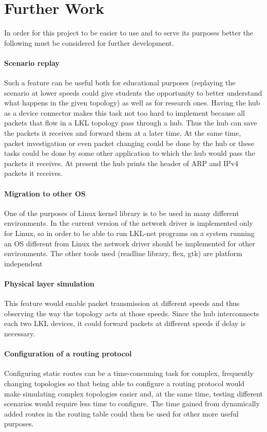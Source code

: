 \chapter{Further Work}
\label{chapter:further}
In order for this project to be easier to use and to serve its purposes better the following must be considered for further development.

\subsubsection{Scenario replay}
\label{sec:scenario-replay}
Such a feature can be useful both for educational purposes (replaying the scenario at lower speeds could give students the opportunity to better understand what happens in the given topology) as well as for research ones. Having the hub as a device connector makes this task not too hard to implement because all packets that flow in a LKL topology pass through a hub. Thus the hub can save the packets it receives and forward them at a later time. At the same time, packet investigation or even packet changing could be done by the hub or these tasks could be done by some other application to which the hub would pass the packets it receives. At present the hub prints the header of ARP and IPv4 packets it receives.

\subsubsection{Migration to other OS}
\label{sec:migration-os}
One of the purposes of Linux kernel library is to be used in many different environments. In the current version of \project the network driver is implemented only for Linux, so in order to be able to run LKL-net programs on a system running an OS different from Linux the network driver should be implemented for other environments.
The other tools used (readline library, flex, gtk) are platform independent%

\subsubsection{Physical layer simulation}
\label{sec:physica-sim}
This feature would enable packet transmission at different speeds and thus observing the way the topology acts at those speeds. Since the hub interconnects each two LKL devices, it could forward packets at different speeds if delay is necessary. 

\subsubsection{Configuration of a routing protocol}
\label{sec:routing-prot}
Configuring static routes can be a time-consuming task for complex, frequently changing topologies so that being able to configure a routing protocol would make simulating complex topologies easier and, at the same time, testing different scenarios would require less time to configure. The time gained from dynamically added routes in the routing table could then be used for other more useful purposes.


